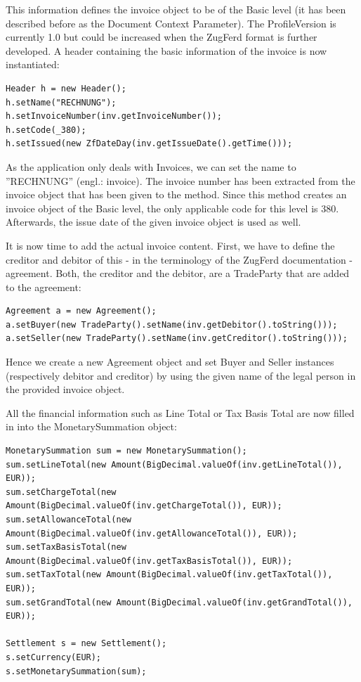 This information defines the invoice object to be of the Basic level (it has been described before as the Document Context Parameter). The ProfileVersion is currently 1.0 but could be increased when the ZugFerd format is further developed.
A header containing the basic information of the invoice is now instantiated:

\begin{lstlisting}[caption={Populating header information}]
Header h = new Header();
h.setName("RECHNUNG");
h.setInvoiceNumber(inv.getInvoiceNumber());
h.setCode(_380);
h.setIssued(new ZfDateDay(inv.getIssueDate().getTime()));
\end{lstlisting}

As the application only deals with Invoices, we can set the name to ''RECHNUNG'' (engl.: invoice). The invoice number has been extracted from the invoice object that has been given to the method.
Since this method creates an invoice object of the Basic level, the only applicable code for this level is 380. Afterwards, the issue date of the given invoice object is used as well.

It is now time to add the actual invoice content. First, we have to define the creditor and debitor of this - in the terminology of the ZugFerd documentation - agreement. Both, the creditor and the debitor, are a TradeParty that are added to the agreement:

\begin{lstlisting}[caption={Creation of a new agreement}]
Agreement a = new Agreement();
a.setBuyer(new TradeParty().setName(inv.getDebitor().toString()));
a.setSeller(new TradeParty().setName(inv.getCreditor().toString()));
\end{lstlisting}

Hence we create a new Agreement object and set Buyer and Seller instances (respectively debitor and creditor) by using the given name of the legal person in the provided invoice object.

All the financial information such as Line Total or Tax Basis Total are now filled in into the MonetarySummation object:

\begin{lstlisting}[caption={Population of the MonetarySummation object}]
MonetarySummation sum = new MonetarySummation();
sum.setLineTotal(new Amount(BigDecimal.valueOf(inv.getLineTotal()), EUR));
sum.setChargeTotal(new Amount(BigDecimal.valueOf(inv.getChargeTotal()), EUR));
sum.setAllowanceTotal(new Amount(BigDecimal.valueOf(inv.getAllowanceTotal()), EUR));
sum.setTaxBasisTotal(new Amount(BigDecimal.valueOf(inv.getTaxBasisTotal()), EUR));
sum.setTaxTotal(new Amount(BigDecimal.valueOf(inv.getTaxTotal()), EUR));
sum.setGrandTotal(new Amount(BigDecimal.valueOf(inv.getGrandTotal()), EUR));

Settlement s = new Settlement();
s.setCurrency(EUR);
s.setMonetarySummation(sum);
\end{lstlisting}

